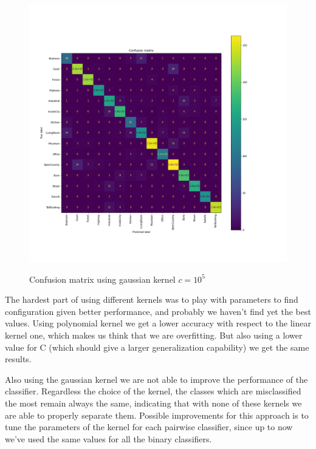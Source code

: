 \documentclass[12pt, a4paper]{report}
\begin{document}
\begin{description}
	\begin{figure}[h!]
		\centering
		{\includegraphics[width=.8\textwidth]{img/gaussian.png}}
		\caption{Confusion matrix using gaussian kernel $c=10^5$}
		\label{fig:gaussianKernel}
	\end{figure}
\end{description}

The hardest part of using different kernels was to play with parameters to find configuration given better performance, and probably we haven't find yet the best values.
Using polynomial kernel we get a lower accuracy with respect to the linear kernel one, which makes us think that we are overfitting. But also using a lower value for C (which should give a larger generalization capability) we get the same results.

Also using the gaussian kernel we are not able to improve the performance of the classifier. Regardless the choice of the kernel, the classes which are misclassified the most remain always the same, indicating that with none of these kernels we are able to properly separate them.
Possible improvements for this approach is to tune the parameters of the kernel for each pairwise classifier, since up to now we've used the same values for all the binary classifiers.
\end{document}
